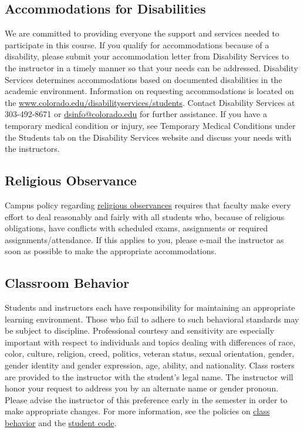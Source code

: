\documentclass[10pt]{memoir}
\begin{document}
\subsection{Accommodations for Disabilities}
We are committed to providing everyone the support and services needed to participate in this course. If you qualify for accommodations because of a disability, please submit your accommodation letter from Disability Services to the instructor in a timely manner so that your needs can be addressed. Disability Services determines accommodations based on documented disabilities in the academic environment. Information on requesting accommodations is located on the \href{Disability Services website}{www.colorado.edu/disabilityservices/students}. Contact Disability Services at 303-492-8671 or \href{mailto:dsinfo@colorado.edu}{dsinfo@colorado.edu} for further assistance. If you have a temporary medical condition or injury, see Temporary Medical Conditions under the Students tab on the Disability Services website and discuss your needs with the instructors.

\subsection{Religious Observance}
Campus policy regarding \href{http://www.colorado.edu/policies/observance-religious-holidays-and-absences-classes-andor-exams}{religious observances} requires that faculty make every effort to deal reasonably and fairly with all students who, because of religious obligations, have conflicts with scheduled exams, assignments or required assignments/attendance. If this applies to you, please e-mail the instructor as soon as possible to make the appropriate accommodations.

\subsection{Classroom Behavior}
Students and instructors each have responsibility for maintaining an appropriate learning environment. Those who fail to adhere to such behavioral standards may be subject to discipline. Professional courtesy and sensitivity are especially important with respect to individuals and topics dealing with differences of race, color, culture, religion, creed, politics, veteran status, sexual orientation, gender, gender identity and gender expression, age, ability, and nationality. Class rosters are provided to the instructor with the student's legal name. The instructor will honor your request to address you by an alternate name or gender pronoun. Please advise the instructor of this preference early in the semester in order to make appropriate changes. For more information, see the policies on \href{http://www.colorado.edu/policies/student-classroom-and-course-related-behavior}{class behavior} and the \href{http://www.colorado.edu/osc/#student_code}{student code}.
\end{document}
